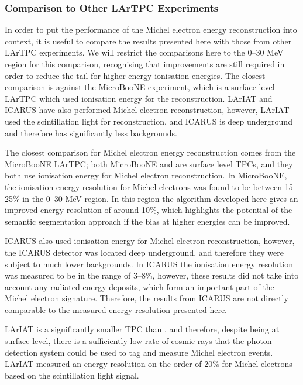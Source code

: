 \subsubsection*{Comparison to Other LArTPC Experiments} \label{ME_COMP}

In order to put the performance of the Michel electron energy
reconstruction into context, it is useful to compare the results presented 
here with those from other LArTPC experiments. We will restrict the 
comparisons here to the 0--30 MeV region for this comparison, recognising that 
improvements are still required in order to reduce the tail for higher energy 
ionisation energies.  The closest comparison is against the MicroBooNE 
experiment, which is a surface level LArTPC which used ionisation energy for 
the reconstruction\cite{Acciarri2017}. LArIAT and ICARUS have also performed 
Michel electron reconstruction, however, 
LArIAT used the scintillation light for reconstruction, and ICARUS is deep 
underground and therefore has significantly less backgrounds.

The closest comparison for Michel electron energy reconstruction comes from the
MicroBooNE LArTPC; both MicroBooNE and \protodune{} are surface level TPCs, and
they both use ionisation energy for Michel electron reconstruction. In
MicroBooNE, the ionisation energy resolution for Michel electrons was found to
be between 15--25\% in the 0--30 MeV region\cite{Acciarri2017}. In this region
the algorithm developed here gives an improved energy resolution of around
10\%, which highlights the potential of the semantic segmentation approach if
the bias at higher energies can be improved.

ICARUS also used ionisation energy for Michel electron reconstruction, however,
the ICARUS detector was located deep underground, and therefore they were
subject to much lower backgrounds. In ICARUS the ionisation energy resolution 
was measured to be in the range of 3--8\%\cite{Amoruso:2003sw}, however, these
results did not take into account any radiated energy deposits, which form an
important part of the Michel electron signature. Therefore, the results from
ICARUS are not directly comparable to the measured energy resolution presented
here.

LArIAT is a significantly smaller TPC than \protodune{}, and therefore, despite
being at surface level, there is a sufficiently low rate of cosmic rays that the
photon detection system could be used to tag and measure Michel electron events.
LArIAT measured an energy resolution on the order of 20\% for Michel electrons 
based on the scintillation light signal\cite{Foreman_2016}. 

